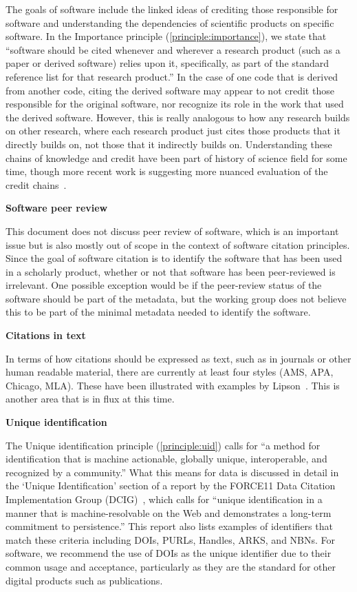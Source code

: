 \documentclass[11pt, oneside]{amsart}
\begin{document}
The goals of software include the linked ideas of crediting those responsible for software and understanding the dependencies of scientific products on specific software.
In the Importance principle (\ref{principle:importance}), we state that
``software should be cited whenever and wherever a research product (such as a paper or derived software) relies upon it, specifically, as part of the standard reference list for that research product.''
In the case of one code that is derived from another code, citing the derived software may appear to not credit those responsible for the original software, nor recognize its role in the work that used the derived software.
However, this is really analogous to how any research builds on other research, where each research product just cites those products that it directly builds on, not those that it indirectly builds on.
Understanding these chains of knowledge and credit have been part of history of science field for some time, though more recent work is suggesting more nuanced evaluation of the credit chains~\cite{casrai-credit, transitive_credit_json-ld}.

\textbf{Software peer review}

This document does not discuss peer review of software, which is an important issue but is
also mostly out of scope in the context of software citation principles.
Since the goal of software citation is to identify the software
that has been used in a scholarly product, whether or not that software has been peer-reviewed
is irrelevant.  One possible exception would be if the peer-review status of the software should
be part of the metadata, but the working group does not believe this to be part of the
minimal metadata needed to identify the software.

\textbf{Citations in text}

In terms of how citations should be expressed as text, such
as in journals or other human readable material, there are currently at least four styles (AMS, APA, Chicago, MLA). These have been illustrated with examples by Lipson~\cite{lipson2011cite}.
This is another area that is in flux at this time.

\textbf{Unique identification}

The Unique identification principle (\ref{principle:uid}) calls for ``a method for identification that is machine actionable, globally unique, interoperable, and recognized by a community.''
What this means for data is discussed in detail in the `Unique Identification' section of a report by the FORCE11 Data Citation Implementation Group (DCIG)~\cite{10.7717/peerj-cs.1}, which calls for ``unique identification in a manner that is machine-resolvable on the Web and demonstrates a long-term commitment to persistence.''
This report also lists examples of identifiers that match these criteria including DOIs, PURLs, Handles, ARKS, and NBNs.
For software, we recommend the use of DOIs as the unique identifier due to their common usage and acceptance, particularly as they are the standard for other digital products such as publications.
\end{document}
